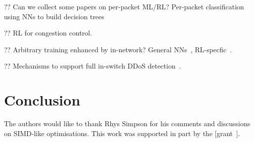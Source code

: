 \documentclass[sigconf,natbib=false]{acmart}
\begin{document}
?? Can we collect some papers on per-packet ML/RL? Per-packet classification using NNs to build decision trees~\parencite{DBLP:conf/sigcomm/LiangZJS19}

?? RL for congestion control. ~\parencite{DBLP:journals/corr/abs-1910-04054}

?? Arbitrary training enhanced by in-network? General NNs~\parencite{DBLP:conf/micro/LiPAYQPWSEK18}, RL-specfic~\parencite{DBLP:conf/isca/LiLYCSH19}.

?? Mechanisms to support full in-switch DDoS detection~\cite{tnms-ddos-victim-ident}.

\section{Conclusion}

\begin{acks}
	The authors would like to thank Rhys Simpson for his comments and discussions on SIMD-like optimisations.
	This work was supported in part by the  [grant~].
\end{acks}
	
%
%
\printbibliography
\end{document}
